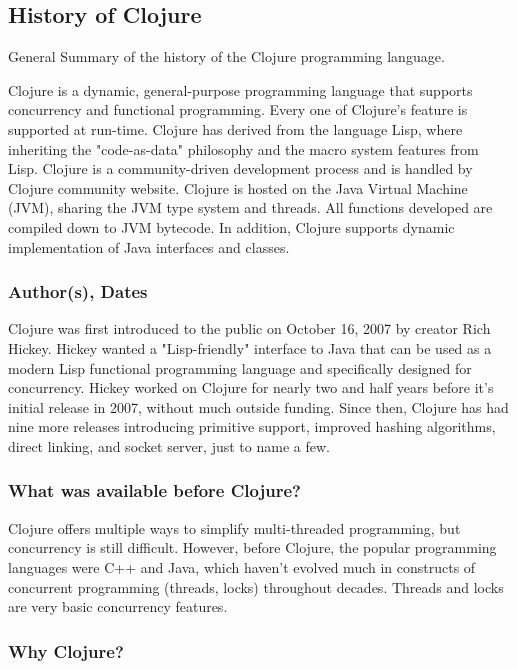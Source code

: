 \subsection{History of Clojure}
    General Summary of the history of the Clojure programming language.
    
	Clojure is a dynamic, general-purpose programming language that supports concurrency and functional programming. Every one of Clojure's feature is supported at run-time. Clojure has derived from the language Lisp, where inheriting the "code-as-data" philosophy and the macro system features from Lisp. Clojure is a community-driven development process and is handled by Clojure community website. Clojure is hosted on the Java Virtual Machine (JVM), sharing the JVM type system and threads. All functions developed are compiled down to JVM bytecode. In addition, Clojure supports dynamic implementation of Java interfaces and classes.
	
\subsubsection{Author(s), Dates}

    Clojure was first introduced to the public on October 16, 2007 by creator Rich Hickey. Hickey wanted a "Lisp-friendly" interface to Java that can be used as a modern Lisp functional programming language and specifically designed for concurrency. Hickey worked on Clojure for nearly two and half years before it's initial release in 2007, without much outside funding. Since then, Clojure has had nine more releases introducing primitive support, improved hashing algorithms, direct linking, and socket server, just to name a few.

\subsubsection{What was available before Clojure?}

    Clojure offers multiple ways to simplify multi-threaded programming, but concurrency is still difficult. However, before Clojure, the popular programming languages were C++ and Java, which haven't evolved much in constructs of concurrent programming (threads, locks) throughout decades. Threads and locks are very basic concurrency features. \cite{galpin_2010}

\subsubsection{Why Clojure?}


